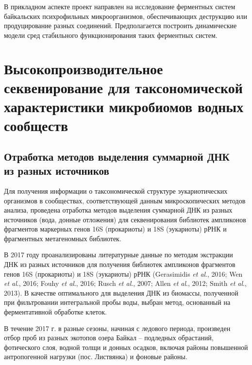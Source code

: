 \documentclass[a4paper,12pt,openany,final]{extreport}
\newcommand\theyear{2017}
\begin{document}
В прикладном аспекте проект направлен на исследование ферментных систем байкальских психрофильных микроорганизмов, обеспечивающих деструкцию или продуцирование разных соединений. Предполагается построить динамические модели сред стабильного функционирования таких ферментных систем.

\chapter{Высокопроизводительное секвенирование для таксономической характеристики микробиомов водных сообществ}
\label{chap:1}

\section[Отработка методов выделения суммарной ДНК из разных источников]{Отработка методов выделения суммарной ДНК\\ из разных источников}

Для получения информации о таксономической структуре эукариотических организмов в сообществах, соответствующей данным микроскопических методов анализа, проведена отработка методов выделения суммарной ДНК из разных источников (вода, донные отложения) для секвенирования библиотек ампликонов фрагментов маркерных генов 16S (прокариоты) и 18S (эукариоты) рРНК и фрагментных метагеномных библиотек.

В \theyear{} году проанализированы литературные данные по методам экстракции ДНК из разных источников для получения библиотек ампликонов фрагментов генов 16S (прокариоты) и 18S (эукариоты) рРНК (Gerasimidis \textit{et al}., 2016; Wen \textit{et al}., 2016; Fouhy \textit{et al}., 2016; Rusch \textit{et al}., 2007; Allen \textit{et al}., 2012; Smith \textit{et al}., 2013). В качестве оптимального для выделения ДНК из биомассы, полученной при фильтровании интегральной пробы воды, выбран метод, основанный на ферментативной обработке клеток.


В течение 2017 г. в разные сезоны, начиная с ледового периода,
произведен отбор проб из разных экотопов озера Байкал -- подледных
обрастаний, фотического слоя, водной толщи и донных осадков, включая
районы повышенной антропогенной нагрузки (пос. Листвянка) и фоновые
районы.
\end{document}
